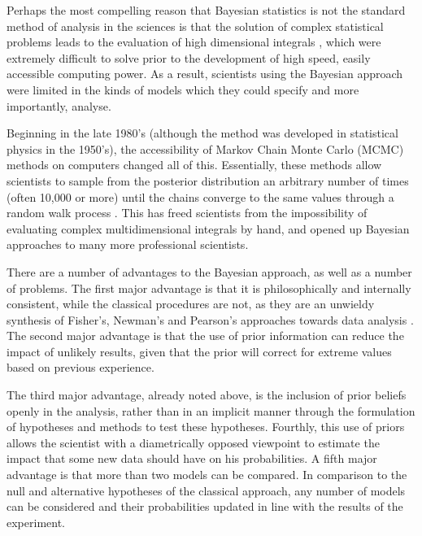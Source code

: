 Perhaps the most compelling reason that Bayesian statistics is not the standard method of analysis in the sciences is that the solution of complex statistical problems leads to the evaluation of high dimensional integrals \cite{gill2002bayesian}, which were extremely difficult to solve prior to the development of high speed, easily accessible computing power. As a result, scientists using the Bayesian approach were limited in the kinds of models which they could specify and more importantly, analyse. 
 
Beginning in the late 1980's (although the method was developed in statistical physics in the 1950's), the accessibility of Markov Chain Monte Carlo (MCMC) methods on computers changed all of this. Essentially, these methods allow scientists to sample from the posterior distribution an arbitrary number of times (often 10,000 or more) until the chains converge to the same values through a random walk process \cite{gelman2004bayesian}. This has freed scientists from the impossibility of evaluating complex multidimensional integrals by hand, and opened up Bayesian approaches to many more professional scientists. 

There are a number of advantages to the Bayesian approach, as well as a number of problems. The first major advantage is that it is philosophically and internally consistent, while the classical procedures are not, as they are an unwieldy synthesis of Fisher's, Newman's and Pearson's approaches towards data analysis \cite{gill2002bayesian, gigerenzer2004mindless}. The second major advantage is that the use of prior information can reduce the impact of unlikely results, given that the prior will correct for extreme values based on previous experience\cite{gelman2010philosophy}. 

The third major advantage, already noted above, is the inclusion of prior beliefs openly in the analysis, rather than in an implicit manner through the formulation of hypotheses and methods to test these hypotheses. Fourthly, this use of priors allows the scientist with a diametrically opposed viewpoint to estimate the impact that some new data should have on his probabilities. A fifth major advantage is that more than two models can be compared. In comparison to the null and alternative hypotheses of the classical approach, any number of models can be considered and their probabilities updated in line with the results of the experiment. 

